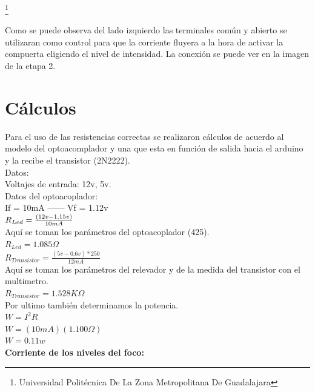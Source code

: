 \documentclass[10pt,a4paper]{article}
\begin{document}
\footnote{Universidad Politécnica De La Zona Metropolitana De Guadalajara}

Como se puede observa del lado izquierdo las terminales común y abierto se utilizaran como control para que la corriente fluyera a la hora de activar la compuerta eligiendo el nivel de intensidad. La conexión se puede ver en la imagen de la etapa 2.

\section{Cálculos}

Para el uso de las resistencias correctas se realizaron cálculos de acuerdo al modelo del optoacomplador y una que esta en función de salida hacia el arduino y la recibe el transistor (2N2222).\\
Datos:\\

Voltajes de entrada: 12v, 5v.\\

Datos del optoacoplador:\\

If = 10mA ------
Vf = 1.12v\\

{\Large $ R_{Led} = {\Large \frac{(12v - 1.15v)}{10mA}}$} \\

Aquí se toman los parámetros del optoacoplador (425).\\

{\Large $R_{Led} = 1.085\Omega$}\\

{\Large $R_{Transistor} = \frac{(5v - 0.6v)*250}{12mA}$}\\

Aquí se toman los parámetros del relevador y de la medida del transistor con el multimetro.\\

{\Large $R_{Transistor} = 1.528K\Omega$}\\

Por ultimo también determinamos la potencia.\\

$ W = I^2 R $\\ 

$ W = (10mA)(1.100\Omega)$\\

$ W = 0.11w $\\

\textbf{Corriente de los niveles del foco:}
\end{document}
